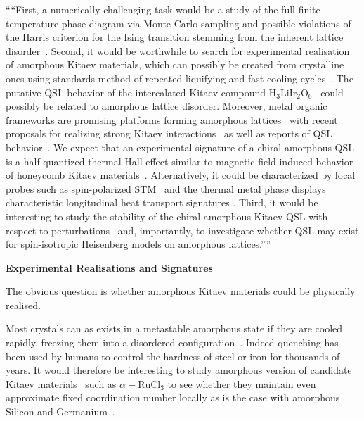 ````First, a numerically challenging task would be a study of the full finite temperature phase diagram via Monte-Carlo sampling and possible violations of the Harris criterion for the Ising transition stemming from the inherent lattice disorder~\autocite{barghathi2014phase,schrauth2018two,schrauth2018violation}. Second, it would be worthwhile to search for experimental realisation of amorphous Kitaev materials, which can possibly be created from crystalline ones using standards method of repeated liquifying and fast cooling cycles~\autocite{Weaire1976,Petrakovski1981,Kaneyoshi2018}. The putative QSL behavior of the intercalated Kitaev compound H\(_3\)LiIr\(_2\)O\(_6\)~\autocite{kitagawa2018spin,knolle2019bond} could possibly be related to amorphous lattice disorder. Moreover, metal organic frameworks are promising platforms forming amorphous lattices~\autocite{bennett2014amorphous} with recent proposals for realizing strong Kitaev interactions~\autocite{yamada2017designing} as well as reports of QSL behavior~\autocite{misumi2020quantum}. We expect that an experimental signature of a chiral amorphous QSL is a half-quantized thermal Hall effect similar to magnetic field induced behavior of honeycomb Kitaev materials~\autocite{Kasahara2018,Yokoi2021,Yamashita2020,Bruin2022}. Alternatively, it could be characterized by local probes such as spin-polarized STM~\autocite{Feldmeier2020,Konig2020,Udagawa2021} and the thermal metal phase displays characteristic longitudinal heat transport signatures \autocite{Beenakker2013}. Third, it would be interesting to study the stability of the chiral amorphous Kitaev QSL with respect to perturbations~\autocite{Rau2014,Chaloupka2010,Chaloupka2013,Chaloupka2015,Winter2016} and, importantly, to investigate whether QSL may exist for spin-isotropic Heisenberg models on amorphous lattices.''''

\textbf{Experimental Realisations and Signatures}

The obvious question is whether amorphous Kitaev materials could be physically realised.

Most crystals can as exists in a metastable amorphous state if they are cooled rapidly, freezing them into a disordered configuration~\autocite{Weaire1976,Petrakovski1981,Kaneyoshi2018}. Indeed quenching has been used by humans to control the hardness of steel or iron for thousands of years. It would therefore be interesting to study amorphous version of candidate Kitaev materials~\autocite{TrebstPhysRep2022} such as \(\alpha-\textrm{RuCl}_3\) to see whether they maintain even approximate fixed coordination number locally as is the case with amorphous Silicon and Germanium~\autocite{Weaire1971,betteridge1973possible}.

